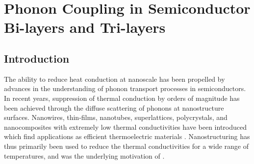 \chapter{Phonon Coupling in Semiconductor Bi-layers and Tri-layers}
\label{chap:layered}
\section{Introduction} 
The ability to reduce heat conduction at nanoscale has been propelled by advances in the understanding of phonon transport processes in semiconductors. In recent years, suppression of thermal conduction by orders of magnitude has been achieved through the diffuse scattering of phonons at nanostructure surfaces. Nanowires, thin-films, nanotubes, superlattices, polycrystals, and nanocomposites with extremely low thermal conductivities have been introduced which find applications as efficient thermoelectric materials \cite{RN136,NW_hochbaum,RN417,RN29,RN88,RN158,RN320,RN132,RN394,RN393,RN240,RN294,ownNW,ownTF,ownSpatialTF}. Nanostructuring has thus primarily been used to reduce the thermal conductivities for a wide range of temperatures, and was the underlying motivation of . 
